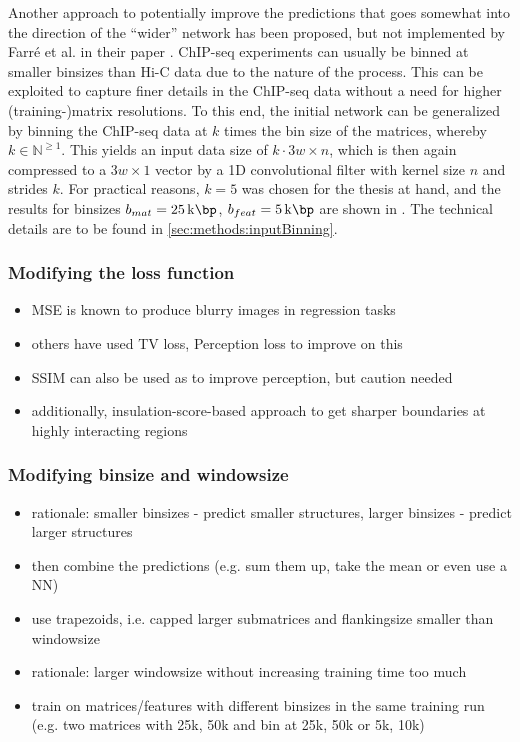 Another approach to potentially improve the predictions that goes somewhat into
the direction of the ``wider'' network has been proposed, but not implemented by Farr\'e et al. 
in their paper \cite{Farre2018a}.
ChIP-seq experiments can usually be binned at smaller binsizes than Hi-C data due to the nature of 
the process. 
This can be exploited to capture finer details in the ChIP-seq data without a need for higher (training-)matrix resolutions.
To this end, the initial network can be generalized by binning the ChIP-seq data at $k$ times the bin size of the matrices, 
whereby $k \in \mathbb{N}^{\geq1}$. 
This yields an input data size of $k \cdot 3w \times n$, which is then again compressed to a $3w \times 1$ vector 
by a 1D convolutional filter with kernel size $n$ and strides $k$. 
For practical reasons, $k=5$ was chosen for the thesis at hand, 
and the results for binsizes $b_{mat}=\SI{25}{\kilo\bp}$, $b_{feat}=\SI{5}{\kilo\bp}$ are shown in \xxx.
The technical details are to be found in \cref{sec:methods:inputBinning}.

\subsubsection{Modifying the loss function}
\begin{itemize}
 \item MSE is known to produce blurry images in regression tasks
 \item others have used TV loss, Perception loss to improve on this
 \item SSIM can also be used as to improve perception, but caution needed
 \item additionally, insulation-score-based approach to get sharper boundaries 
            at highly interacting regions
\end{itemize}

\subsubsection{Modifying binsize and windowsize}
\begin{itemize}
 \item rationale: smaller binsizes - predict smaller structures, larger binsizes - predict larger structures
 \item then combine the predictions (e.g. sum them up, take the mean or even use a NN)
 \item use trapezoids, i.e. capped larger submatrices and flankingsize smaller than windowsize
 \item rationale: larger windowsize without increasing training time too much 
 \item train on matrices/features with different binsizes in the same training run (e.g. two matrices with 25k, 50k and bin at 25k, 50k or 5k, 10k)
 \end{itemize}

